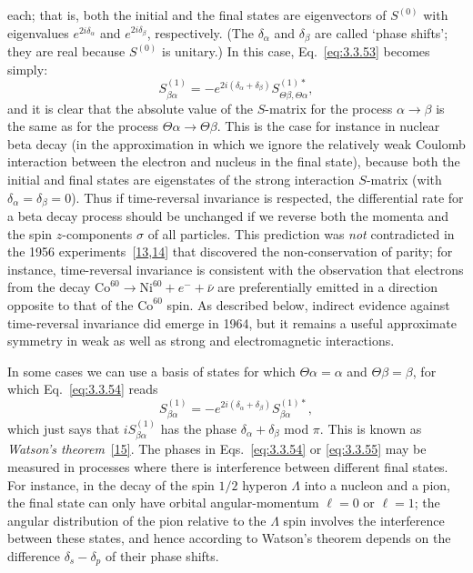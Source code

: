 each; that is, both the initial and the final states are eigenvectors of $S^{(0)}$
with eigenvalues $e^{2i\delta_\alpha}$ and $e^{2i\delta_\beta}$, respectively.
(The $\delta_\alpha$ and $\delta_\beta$ are called `phase shifts'; they are real
because $S^{(0)}$ is unitary.) In this case, Eq.~\eqref{eq:3.3.53} becomes simply:
\begin{equation}
S^{(1)}_{\beta\alpha}
=-e^{2i(\delta_\alpha+\delta_\beta)}
S^{(1)*}_{\Theta\beta,\Theta\alpha},
\tag{3.3.54}\label{eq:3.3.54}
\end{equation}
and it is clear that the absolute value of the $S$-matrix for the process
$\alpha\to\beta$ is the same as for the process
$\Theta\alpha\to\Theta\beta$. This is the case for instance in nuclear beta decay
(in the approximation in which we ignore the relatively weak Coulomb interaction
between the electron and nucleus in the final state), because both the initial and
final states are eigenstates of the strong interaction $S$-matrix (with
$\delta_\alpha=\delta_\beta=0$). Thus if time-reversal invariance is respected, the
differential rate for a beta decay process should be unchanged if we reverse both
the momenta and the spin $z$-components $\sigma$ of all particles. This prediction
was \textit{not} contradicted in the 1956 experiments~[\hyperref[ref:3.13]{13},\hyperref[ref:3.14]{14}] that discovered the
non-conservation of parity; for instance, time-reversal invariance is consistent
with the observation that electrons from the decay
$\mathrm{Co}^{60}\to\mathrm{Ni}^{60}+e^-+\bar\nu$ are preferentially emitted in
a direction opposite to that of the $\mathrm{Co}^{60}$ spin. As described below,
indirect evidence against time-reversal invariance did emerge in 1964, but it
remains a useful approximate symmetry in weak as well as strong and electromagnetic
interactions.

In some cases we can use a basis of states for which $\Theta\alpha=\alpha$ and
$\Theta\beta=\beta$, for which Eq.~\eqref{eq:3.3.54} reads
\begin{equation}
S^{(1)}_{\beta\alpha}
=-e^{2i(\delta_\alpha+\delta_\beta)}S^{(1)*}_{\beta\alpha},
\tag{3.3.55}\label{eq:3.3.55}
\end{equation}
which just says that $iS^{(1)}_{\beta\alpha}$ has the phase
$\delta_\alpha+\delta_\beta$ mod $\pi$. This is known as \textit{Watson's
theorem}~\hyperref[ref:3.15]{[15]}. The phases in Eqs.~\eqref{eq:3.3.54} or \eqref{eq:3.3.55} may be measured in
processes where there is interference between different final states. For instance,
in the decay of the spin $1/2$ hyperon $\Lambda$ into a nucleon and a pion, the
final state can only have orbital angular-momentum $\ell=0$ or $\ell=1$; the angular
distribution of the pion relative to the $\Lambda$ spin involves the interference
between these states, and hence according to Watson's theorem depends on the
difference $\delta_s-\delta_p$ of their phase shifts.

